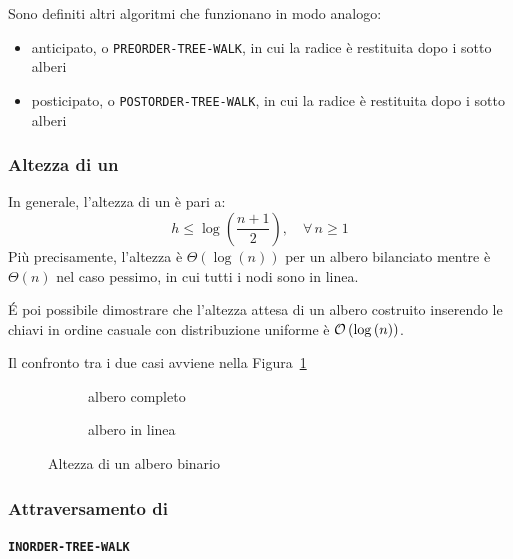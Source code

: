 \documentclass[italian, 10pt]{article}
\begin{document}
Sono definiti altri algoritmi che funzionano in modo analogo:

\begin{itemize}
  \item anticipato, o \texttt{PREORDER-TREE-WALK}, in cui la radice è restituita dopo i sotto alberi
  \item posticipato, o \texttt{POSTORDER-TREE-WALK}, in cui la radice è restituita dopo i sotto alberi
\end{itemize}

\subsubsection{Altezza di un \BST}

In generale, l'altezza di un \BST è pari a:
\[ h \leq \log{\left(\dfrac{n+1}{2}\right)}, \quad \forall \, n \geq 1\]
Più precisamente, l'altezza è \(\Theta(\log{(n)})\) per un albero bilanciato mentre è \(\Theta(n)\) nel caso pessimo, in cui tutti i nodi sono in linea.

\bigskip
É poi possibile dimostrare che l'altezza attesa di un albero costruito inserendo le chiavi in ordine casuale con distribuzione uniforme è \(\mathcal{O}\left(\log{(n)}\right)\).

\bigskip
Il confronto tra i due casi avviene nella Figura~\ref{fig:altezza-albero-binario}

\begin{figure}[htbp]
  \bigskip
  \centering
  \begin{subfigure}[b]{0.495\textwidth}
    \centering
    \caption{albero completo}
  \end{subfigure}
  \begin{subfigure}[b]{0.495\textwidth}
    \centering
    \caption{albero in linea}
  \end{subfigure}
  \caption{Altezza di un albero binario}
  \label{fig:altezza-albero-binario}
  \bigskip
\end{figure}

\subsubsection{Attraversamento di \BST}

\paragraph{\texttt{INORDER-TREE-WALK} }
\end{document}
